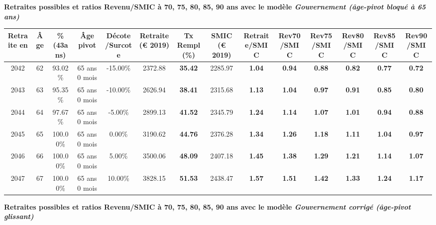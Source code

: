 {\bf \noindent Retraites possibles et ratios Revenu/SMIC à 70, 75, 80, 85, 90 ans avec le modèle \emph{Gouvernement (âge-pivot bloqué à 65 ans)}}  
 
\begin{adjustbox}{max width=\textwidth} 
\begin{tabular}[htb]{|c|c||c|c|c||c|c||c||c|c|c|c|c|c|} 
\hline 
 Retraite en &  Âge &  \%(43ans) &  Âge pivot &  Décote/Surcote &  Retraite (\euro{} 2019) &  Tx Rempl(\%) &  SMIC (\euro{} 2019) &  Retraite/SMIC &  Rev70/SMIC &  Rev75/SMIC &  Rev80/SMIC &  Rev85/SMIC &  Rev90/SMIC \\ 
\hline \hline 
 2042 &  62 &  93.02\% &  65 ans 0 mois &  -15.00\% &  2372.88 &  {\bf 35.42} &  2285.97 &  {\bf 1.04} &  {\bf {\color{red} 0.94}} &  {\bf {\color{red} 0.88}} &  {\bf {\color{red} 0.82}} &  {\bf {\color{red} 0.77}} &  {\bf {\color{red} 0.72}} \\ 
\hline 
 2043 &  63 &  95.35\% &  65 ans 0 mois &  -10.00\% &  2626.94 &  {\bf 38.41} &  2315.68 &  {\bf 1.13} &  {\bf 1.04} &  {\bf {\color{red} 0.97}} &  {\bf {\color{red} 0.91}} &  {\bf {\color{red} 0.85}} &  {\bf {\color{red} 0.80}} \\ 
\hline 
 2044 &  64 &  97.67\% &  65 ans 0 mois &  -5.00\% &  2899.13 &  {\bf 41.52} &  2345.79 &  {\bf 1.24} &  {\bf 1.14} &  {\bf 1.07} &  {\bf 1.01} &  {\bf {\color{red} 0.94}} &  {\bf {\color{red} 0.88}} \\ 
\hline 
 2045 &  65 &  100.00\% &  65 ans 0 mois &  0.00\% &  3190.62 &  {\bf 44.76} &  2376.28 &  {\bf 1.34} &  {\bf 1.26} &  {\bf 1.18} &  {\bf 1.11} &  {\bf 1.04} &  {\bf {\color{red} 0.97}} \\ 
\hline 
 2046 &  66 &  100.00\% &  65 ans 0 mois &  5.00\% &  3500.06 &  {\bf 48.09} &  2407.18 &  {\bf 1.45} &  {\bf 1.38} &  {\bf 1.29} &  {\bf 1.21} &  {\bf 1.14} &  {\bf 1.07} \\ 
\hline 
 2047 &  67 &  100.00\% &  65 ans 0 mois &  10.00\% &  3828.15 &  {\bf 51.53} &  2438.47 &  {\bf 1.57} &  {\bf 1.51} &  {\bf 1.42} &  {\bf 1.33} &  {\bf 1.24} &  {\bf 1.17} \\ 
\hline 
\hline 
\end{tabular} 
\end{adjustbox} 
 
 \vspace{0.1cm} 
{\bf \noindent Retraites possibles et ratios Revenu/SMIC à 70, 75, 80, 85, 90 ans avec le modèle \emph{Gouvernement corrigé (âge-pivot glissant)}}  
 
